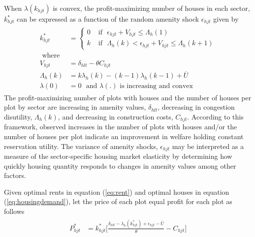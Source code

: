 \documentclass[12pt]{article}
\begin{document}
When $\lambda(k_{hjt})$ is convex, the profit-maximizing number of houses in each sector, $k^{*}_{hjt}$ can be expressed as a function of the random amenity shock $\epsilon_{hjt}$ given by
\begin{align}
\label{eq:housingdemand}
\begin{split}
k_{hjt}^{*} &=
\begin{cases}
0 &\text{ if }\,\, \epsilon_{hjt} + V_{hjt} \leq \Lambda_{h}(1)  \\
k &\text{ if }\,\,  \Lambda_{h}(k) < \epsilon_{hjt} + V_{hjt} \leq \Lambda_{h}(k+1)
\end{cases} \\
\text{ where }& \\
V_{hjt} & = \delta_{hlt}  - \theta C_{hjt}   \\
\Lambda_{h}(k) & =  k\lambda_{h}(k) - (k-1)\lambda_{h}(k-1) + \overline{U} \\
\lambda(0) & = 0 \,\, \text{ and } \lambda(.) \text{ is increasing and convex }
\end{split}
\end{align}
The profit-maximizing number of plots with houses and the number of houses per plot by sector are increasing in amenity values, $\delta_{hlt}$, decreasing in congestion disutility, $\Lambda_{h}(k)$, and decreasing in construction costs, $C_{hjt}$.  According to this framework, observed increases in the number of plots with houses and/or the number of houses per plot indicate an improvement in welfare holding constant reservation utility.  The variance of amenity shocks, $\epsilon_{hjt}$ may be interpreted as a measure of the sector-specific housing market elasticity by determining how quickly housing quantity responds to changes in amenity values among other factors.

Given optimal rents in equation (\ref{eq:rent}) and optimal houses in equation (\ref{eq:housingdemand}), let the price of each plot equal profit for each plot as follows
\begin{align}
\label{eq:profits}
\begin{split}
P_{hjt}^{*}  &=
k_{hjt}^{*} \Big[ \frac{ \delta_{hlt} - \lambda_{h}(k_{hjt}^{*}) + \epsilon_{hjt} - \overline{U}}{\theta}  - C_{hjt}\Big] 
\end{split}
\end{align}
\end{document}
